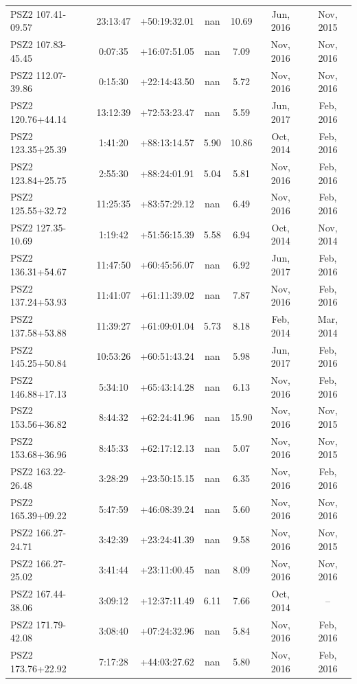 \documentclass[apj, revtex4]{emulateapj}
\begin{document}
\begin{longtable*}{lcccccc}
PSZ2 107.41-09.57 & 23:13:47 & +50:19:32.01 & nan & 10.69 & Jun, 2016 & Nov, 2015\\
PSZ2 107.83-45.45 & 0:07:35 & +16:07:51.05 & nan & 7.09 & Nov, 2016 & Nov, 2016\\
PSZ2 112.07-39.86 & 0:15:30 & +22:14:43.50 & nan & 5.72 & Nov, 2016 & Nov, 2016\\
PSZ2 120.76+44.14 & 13:12:39 & +72:53:23.47 & nan & 5.59 & Jun, 2017 & Feb, 2016\\
PSZ2 123.35+25.39 & 1:41:20 & +88:13:14.57 & 5.90 & 10.86 & Oct, 2014 & Feb, 2016\\
PSZ2 123.84+25.75 & 2:55:30 & +88:24:01.91 & 5.04 & 5.81 & Nov, 2016 & Feb, 2016\\
PSZ2 125.55+32.72 & 11:25:35 & +83:57:29.12 & nan & 6.49 & Nov, 2016 & Feb, 2016\\
PSZ2 127.35-10.69 & 1:19:42 & +51:56:15.39 & 5.58 & 6.94 & Oct, 2014 & Nov, 2014\\
PSZ2 136.31+54.67 & 11:47:50 & +60:45:56.07 & nan & 6.92 & Jun, 2017 & Feb, 2016\\
PSZ2 137.24+53.93 & 11:41:07 & +61:11:39.02 & nan & 7.87 & Nov, 2016 & Feb, 2016\\
PSZ2 137.58+53.88 & 11:39:27 & +61:09:01.04 & 5.73 & 8.18 & Feb, 2014 & Mar, 2014\\
PSZ2 145.25+50.84 & 10:53:26 & +60:51:43.24 & nan & 5.98 & Jun, 2017 & Feb, 2016\\
PSZ2 146.88+17.13 & 5:34:10 & +65:43:14.28 & nan & 6.13 & Nov, 2016 & Feb, 2016\\
PSZ2 153.56+36.82 & 8:44:32 & +62:24:41.96 & nan & 15.90 & Nov, 2016 & Nov, 2015\\
PSZ2 153.68+36.96 & 8:45:33 & +62:17:12.13 & nan & 5.07 & Nov, 2016 & Nov, 2015\\
PSZ2 163.22-26.48 & 3:28:29 & +23:50:15.15 & nan & 6.35 & Nov, 2016 & Feb, 2016\\
PSZ2 165.39+09.22 & 5:47:59 & +46:08:39.24 & nan & 5.60 & Nov, 2016 & Nov, 2016\\
PSZ2 166.27-24.71 & 3:42:39 & +23:24:41.39 & nan & 9.58 & Nov, 2016 & Nov, 2015\\
PSZ2 166.27-25.02 & 3:41:44 & +23:11:00.45 & nan & 8.09 & Nov, 2016 & Nov, 2016\\
PSZ2 167.44-38.06 & 3:09:12 & +12:37:11.49 & 6.11 & 7.66 & Oct, 2014 & --\\
PSZ2 171.79-42.08 & 3:08:40 & +07:24:32.96 & nan & 5.84 & Nov, 2016 & Feb, 2016\\
PSZ2 173.76+22.92 & 7:17:28 & +44:03:27.62 & nan & 5.80 & Nov, 2016 & Feb, 2016\\

\end{longtable*}
\end{document}
